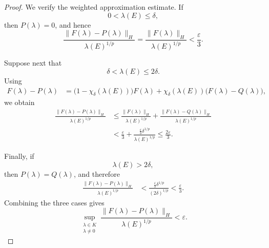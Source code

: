 \documentclass[a4paper,10pt]{article}
\begin{document}
\begin{proof}
We verify the weighted approximation estimate. If
\[
        0<\lambda(E)\le\delta,
\]
then \(P(\lambda)=0\), and hence
\[
\frac{\lVert F(\lambda)-P(\lambda)\rVert_H}
     {\lambda(E)^{1/p}}
=
\frac{\lVert F(\lambda)\rVert_H}
     {\lambda(E)^{1/p}}
<
\frac{\varepsilon}{3}.
\]

Suppose next that
\[
        \delta<\lambda(E)\le2\delta.
\]
Using
\[
\begin{aligned}
F(\lambda)-P(\lambda)
&=
\bigl(1-\chi_\delta(\lambda(E))\bigr)F(\lambda)
+
\chi_\delta(\lambda(E))
\bigl(F(\lambda)-Q(\lambda)\bigr),
\end{aligned}
\]
we obtain
\[
\begin{aligned}
\frac{\lVert F(\lambda)-P(\lambda)\rVert_H}
     {\lambda(E)^{1/p}}
&\le
\frac{\lVert F(\lambda)\rVert_H}
     {\lambda(E)^{1/p}}
+
\frac{\lVert F(\lambda)-Q(\lambda)\rVert_H}
     {\lambda(E)^{1/p}}
\\
&<
\frac{\varepsilon}{3}
+
\frac{
        \frac{\varepsilon}{3}\delta^{1/p}
     }{
        \lambda(E)^{1/p}
     }
\le
\frac{2\varepsilon}{3}.
\end{aligned}
\]

Finally, if
\[
        \lambda(E)>2\delta,
\]
then \(P(\lambda)=Q(\lambda)\), and therefore
\[
\begin{aligned}
\frac{\lVert F(\lambda)-P(\lambda)\rVert_H}
     {\lambda(E)^{1/p}}
&<
\frac{
        \frac{\varepsilon}{3}\delta^{1/p}
     }{
        (2\delta)^{1/p}
     }
<
\frac{\varepsilon}{3}.
\end{aligned}
\]
Combining the three cases gives
\[
\sup_{\substack{\lambda\in K\\ \lambda\ne0}}
\frac{\lVert F(\lambda)-P(\lambda)\rVert_H}
     {\lambda(E)^{1/p}}
<
\varepsilon.
\]


\end{proof}
\end{document}
